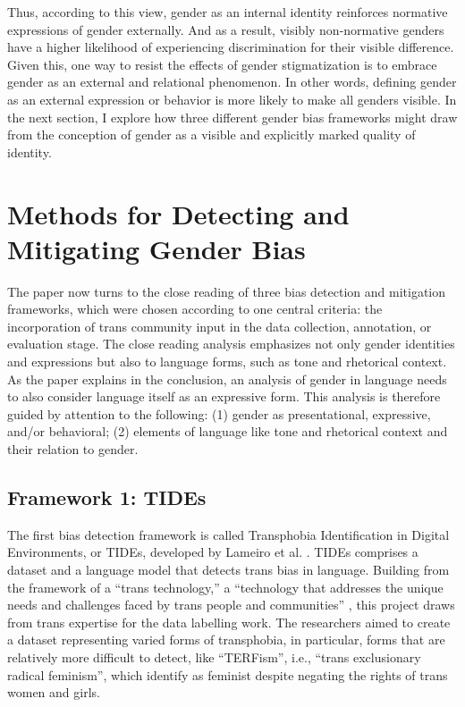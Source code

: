 \documentclass[11pt]{article}
\begin{document}
Thus, according to this view, gender as an internal identity reinforces normative expressions of gender externally. And as a result, visibly non-normative genders have a higher likelihood of experiencing discrimination for their visible difference. Given this, one way to resist the effects of gender stigmatization is to embrace gender as an external and relational phenomenon. In other words, defining gender as an external expression or behavior is more likely to make all genders visible. In the next section, I explore how three different gender bias frameworks might draw from the conception of gender as a visible and explicitly marked quality of identity.

\section{Methods for Detecting and Mitigating Gender Bias}
The paper now turns to the close reading of three bias detection and mitigation frameworks, which were chosen according to one central criteria: the incorporation of trans community input in the data collection, annotation, or evaluation stage. The close reading analysis emphasizes not only gender identities and expressions but also to language forms, such as tone and rhetorical context. As the paper explains in the conclusion, an analysis of gender in language needs to also consider language itself as an expressive form. This analysis is therefore guided by attention to the following: (1) gender as presentational, expressive, and/or behavioral; (2) elements of language like tone and rhetorical context and their relation to gender. 

\subsection{Framework 1: TIDEs}
The first bias detection framework is called Transphobia Identification in Digital Environments, or TIDEs, developed by Lameiro et al. \citep{lameiro:2025}. TIDEs comprises a dataset and a language model that detects trans bias in language. Building from the framework of a “trans technology,” a “technology that addresses the unique needs and challenges faced by trans people and communities” \citep{haimson:2025}, this project draws from trans expertise for the data labelling work. The researchers aimed to create a dataset representing varied forms of transphobia, in particular, forms that are relatively more difficult to detect, like “TERFism”, i.e., “trans exclusionary radical feminism”, which identify as feminist despite negating the rights of trans women and girls. 
\end{document}
